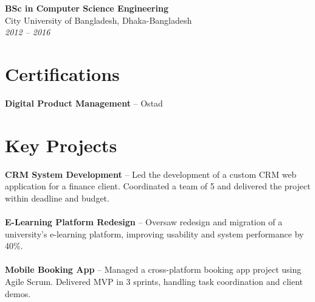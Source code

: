 \documentclass[a4paper,10pt]{article}
\begin{document}
\textbf{BSc in Computer Science Engineering} \\
City University of Bangladesh, Dhaka-Bangladesh \\
\textit{2012 – 2016}\\

\section*{Certifications}
\textbf{Digital Product Management}  – Ostad \\

\section*{Key Projects}
\textbf{CRM System Development } – Led the development of a custom CRM web application for a finance client. Coordinated a team of 5 and delivered the project within deadline and budget.  \\\\
\textbf{E-Learning Platform Redesign }  – Oversaw redesign and migration of a university's e-learning platform, improving usability and system performance by 40\%. \\\\
\textbf{Mobile Booking App} – Managed a cross-platform booking app project using Agile Scrum. Delivered MVP in 3 sprints, handling task coordination and client demos. \\\\
\end{document}
